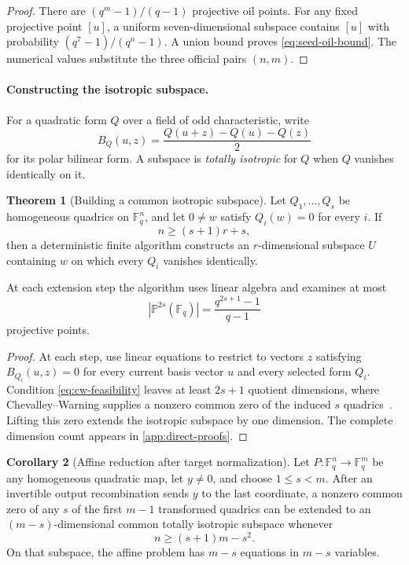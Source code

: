 \documentclass[11pt,a4paper]{article}
\theoremstyle{definition}
\newtheorem{theorem}{Theorem}[section]
\newtheorem{corollary}[theorem]{Corollary}
\theoremstyle{remark}
\newcommand{\F}{\mathbb F}
\newcommand{\PP}{\mathbb P}
\begin{document}
\begin{proof}
There are $(q^m-1)/(q-1)$ projective oil points.  For any fixed projective
point $[u]$, a uniform seven-dimensional subspace contains $[u]$ with
probability $(q^7-1)/(q^n-1)$.  A union bound proves
\eqref{eq:seed-oil-bound}.  The numerical values substitute the three official
pairs $(n,m)$.
\end{proof}

\paragraph{Constructing the isotropic subspace.}

For a quadratic form $Q$ over a field of odd characteristic, write
\[
 B_Q(u,z)=\frac{Q(u+z)-Q(u)-Q(z)}2
\]
for its polar bilinear form.  A subspace is \emph{totally isotropic} for $Q$ when $Q$ vanishes identically on it.

\begin{theorem}[Building a common isotropic subspace]\label{thm:cw-extension}
Let $Q_1,\ldots,Q_s$ be homogeneous quadrics on $\F_q^n$, and let $0\ne w$ satisfy $Q_i(w)=0$ for every $i$.  If
\begin{equation}\label{eq:cw-feasibility}
 n\ge(s+1)r+s,
\end{equation}
then a deterministic finite algorithm constructs an $r$-dimensional subspace $U$ containing $w$ on which every $Q_i$ vanishes identically.

At each extension step the algorithm uses linear algebra and examines at most
\begin{equation}\label{eq:cw-projective-count}
 \left|\PP^{2s}(\F_q)\right|
 =\frac{q^{2s+1}-1}{q-1}
\end{equation}
projective points.
\end{theorem}

\begin{proof}
At each step, use linear equations to restrict to vectors $z$ satisfying
$B_{Q_i}(u,z)=0$ for every current basis vector $u$ and every selected form
$Q_i$.  Condition \eqref{eq:cw-feasibility} leaves at least $2s+1$
quotient dimensions, where Chevalley--Warning supplies a nonzero common zero
of the induced $s$ quadrics~\cite{Chevalley1935,Warning1935}.  Lifting this
zero extends the isotropic subspace by one dimension.  The complete dimension
count appears in \cref{app:direct-proofs}.
\end{proof}

\begin{corollary}[Affine reduction after target normalization]\label{cor:generic-target-slicing}
Let $P:\F_q^n\to\F_q^m$ be any homogeneous quadratic map, let $y\ne0$, and
choose $1\le s<m$.  After an invertible output recombination sends $y$ to the
last coordinate, a nonzero common zero of any $s$ of the first $m-1$
transformed quadrics can be extended to an $(m-s)$-dimensional common totally
isotropic subspace whenever
\begin{equation}\label{eq:generic-square-condition}
 n\ge(s+1)m-s^2.
\end{equation}
On that subspace, the affine problem has $m-s$ equations in $m-s$ variables.
\end{corollary}
\end{document}

